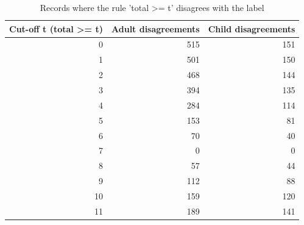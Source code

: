 \begin{table}
\caption{Records where the rule 'total >= t' disagrees with the label}
\label{tab:table3_threshold_scan}
\begin{tabular}{rrr}
\toprule
Cut-off t (total >= t) & Adult disagreements & Child disagreements \\
\midrule
0 & 515 & 151 \\
1 & 501 & 150 \\
2 & 468 & 144 \\
3 & 394 & 135 \\
4 & 284 & 114 \\
5 & 153 & 81 \\
6 & 70 & 40 \\
7 & 0 & 0 \\
8 & 57 & 44 \\
9 & 112 & 88 \\
10 & 159 & 120 \\
11 & 189 & 141 \\
\bottomrule
\end{tabular}
\end{table}

